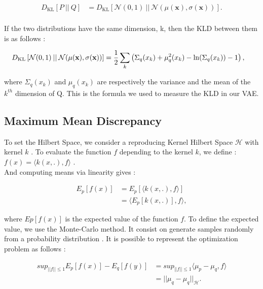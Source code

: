 \documentclass[11pt, english]{article}
\begin{document}
\begin{equation}
\begin{split}
D_{\text{KL}}\left[P \: || \: Q \right] &=   D_{\text{KL}}\left[ \mathcal{N}(0,1) \: || \:  \mathcal{N}(\mu(\textbf{x}) , \sigma(\textbf{x})) \right].\\
\end{split}
\end{equation}

If the two distributions have the same dimension, k, then the KLD between them is as follows :

\begin{equation}
\begin{split}
D_{\text{KL}}\left[ \mathcal{N}(0,1) \: || \:  \mathcal{N}(\mu(\textbf{x}) , \sigma(\textbf{x})) \right]
&= {1 \over 2} \sum_{k} \left( \Sigma_q(x_k) +\mu_q^{2}(x_k) - \ln(\Sigma_q(x_k) ) - 1 \right),
\end{split}
\end{equation}

where $\Sigma_q(x_k)$ and $\mu_q(x_k)$ are respectively the variance and the mean of the $k^{th}$ dimension of Q.
This is the formula we used to measure the KLD in our VAE.

\subsection{Maximum Mean Discrepancy}
To set the Hilbert Space, we consider a reproducing Kernel Hilbert Space $\mathcal{H}$ with kernel $k$ \cite{ref_MMD_1}. To evaluate the function $f$ depending to the kernel $k$, we define : $f(x) = \langle {k(x,.),f} \rangle $ .\\
And computing means via linearity gives :

\begin{align}
    E_{p} [f(x)] &= E_p[\langle k(x,.), f\rangle ]  \\
    &= \langle E_p[k(x,.)],f \rangle ,
\end{align}

where $Ep[f(x)]$ is the expected value of the function $f$. To define the expected value, we use the Monte-Carlo method. It consist on generate samples randomly from a probability distribution \cite{monte_carlo_method}.
It is possible to represent the optimization problem as follows :

\begin{align}
    sup_{||f|| \leq 1} E_p[f(x)] - E_q[f(y)] &= sup_{||f|| \leq 1} \langle \mu_p -\mu_q , f \rangle \\
    &= ||\mu_q - \mu_q||_\mathcal{H}.
\end{align}
\end{document}
